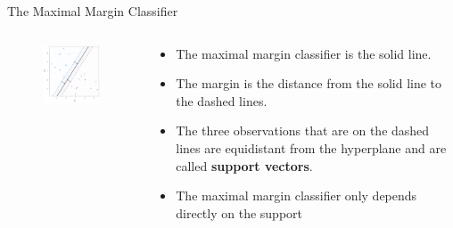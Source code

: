 \documentclass[
  ignorenonframetext,
  aspectratio=169,
]{beamer}
\begin{document}
\begin{frame}{The Maximal Margin Classifier}
\protect\hypertarget{the-maximal-margin-classifier-1}{}
\begin{columns}[T]
\begin{column}{0.45\textwidth}
\begin{figure}

{\centering \includegraphics[width=2.60417in,height=\textheight]{images/maxmargin.png}

}

\end{figure}
\end{column}

\begin{column}{0.55\textwidth}
\begin{itemize}
\item
  The maximal margin classifier is the solid line.
\item
  The margin is the distance from the solid line to the dashed lines.
\item
  The three observations that are on the dashed lines are equidistant
  from the hyperplane and are called \textbf{support vectors}.
\item
  The maximal margin classifier only depends directly on the support
\end{itemize}
\end{column}
\end{columns}
\end{frame}
\end{document}
